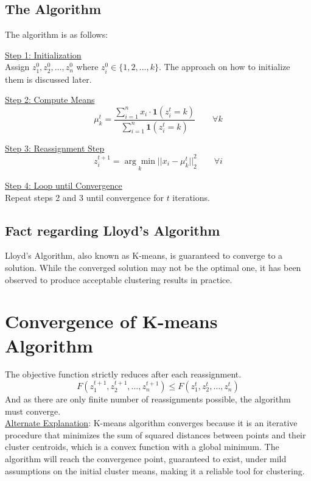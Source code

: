 \documentclass[letterpaper,11pt]{article}
\begin{document}
\newpage
\subsection{The Algorithm}

The algorithm is as follows:

\underline{Step 1: Initialization} \\
Assign $z_1^0, z_2^0, \ldots, z_n^0$ where $z_i^0 \in \{1, 2, \ldots, k\}$. The approach on how to initialize them is discussed later.
    
\underline{Step 2: Compute Means} \\
$$
\mu _k ^t = \frac{\displaystyle \sum _{i = 1} ^{n} {x_i \cdot \mathbf{1}(z_i^t=k)}}{\displaystyle \sum _{i = 1} ^{n} {\mathbf{1}(z_i^t=k)}} \hspace{2em} \forall k
$$
    
\underline{Step 3: Reassignment Step} \\
$$
z _i ^{t+1} = \underset{k}{\arg \min} {|| x_i - \mu _{k} ^t ||}_2 ^2 \hspace{2em} \forall i
$$

\underline{Step 4: Loop until Convergence} \\
Repeat steps 2 and 3 until convergence for $t$ iterations.

\subsection{Fact regarding Lloyd's Algorithm}
Lloyd's Algorithm, also known as K-means, is guaranteed to converge to a solution. While the converged solution may not be the optimal one, it has been observed to produce acceptable clustering results in practice.

\section{Convergence of K-means Algorithm}
The objective function strictly reduces after each reassignment.
$$
F(z_1^{t+1}, z_2^{t+1}, \ldots, z_n^{t+1}) \le F(z_1^{t}, z_2^{t}, \ldots, z_n^{t})
$$
And as there are only finite number of reassignments possible, the algorithm must converge. \\
\underline{Alternate Explanation}: K-means algorithm converges because it is an iterative procedure that minimizes the sum of squared distances between points and their cluster centroids, which is a convex function with a global minimum. The algorithm will reach the convergence point, guaranteed to exist, under mild assumptions on the initial cluster means, making it a reliable tool for clustering.
\newpage
\end{document}
